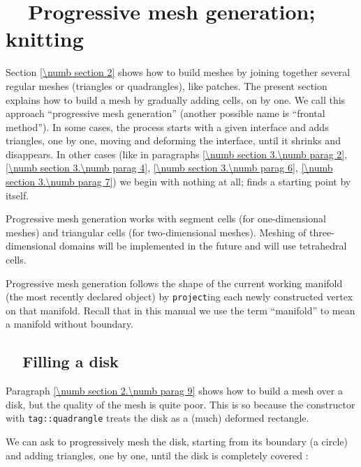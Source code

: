 
\chapter{~~Progressive mesh generation; knitting}\label{\numb section 3}

Section \ref{\numb section 2} shows how to build meshes by joining together several regular meshes
(triangles or quadrangles), like patches.
The present section explains how to build a mesh by gradually adding cells, on by one.
We call this approach ``progressive mesh generation''
(another possible name is ``frontal method'').
In some cases, the process starts with a given interface and adds triangles, one by one,
moving and deforming the interface, until it shrinks and disappears.
In other cases (like in paragraphs \ref{\numb section 3.\numb parag 2},
\ref{\numb section 3.\numb parag 4}, \ref{\numb section 3.\numb parag 6},
\ref{\numb section 3.\numb parag 7}) we begin with nothing at all;
{\maniFEM} finds a starting point by itself.

Progressive mesh generation works with segment cells (for one-dimensional meshes) and
triangular cells (for two-dimensional meshes).
Meshing of three-dimensional domains will be implemented in the future and will use tetrahedral
cells.

Progressive mesh generation follows the shape of the current working manifold (the most recently
declared {\small\tt{}} object) by {\small\tt project}ing each newly constructed vertex
on that manifold.
Recall that in this manual we use the term ``manifold'' to mean a manifold without boundary.


\section{~~Filling a disk}\label{\numb section 3.\numb parag 1}

Paragraph \ref{\numb section 2.\numb parag 9} shows how to build a mesh over a disk,
but the quality of the mesh is quite poor.
This is so because the {\small\tt{}} constructor with
{\small\tt\textcolor{tag}{tag}::quadrangle} treats the disk as a (much) deformed rectangle.

We can ask {\maniFEM} to progressively mesh the disk, starting from its boundary (a circle)
and adding triangles, one by one, until the disk is completely covered :

